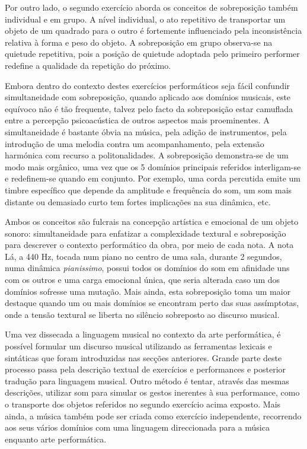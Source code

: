 \documentclass[../main.tex]{subfiles}
\begin{document}
Por outro lado, o segundo exercício aborda os conceitos de sobreposição também individual e em grupo. A nível individual, o ato repetitivo de transportar um objeto de um quadrado para o outro é fortemente influenciado pela inconsistência relativa à forma e peso do objeto. A sobreposição em grupo observa-se na quietude repetitiva, pois a posição de quietude adoptada pelo primeiro performer redefine a qualidade da repetição do próximo.

Embora dentro do contexto destes exercícios performáticos seja fácil confundir simultaneidade com sobreposição, quando aplicado aos domínios musicais, este equívoco não é tão frequente, talvez pelo facto da sobreposição estar camuflada entre a percepção psicoacústica de outros aspectos mais proeminentes. A simultaneidade é bastante óbvia na música, pela adição de instrumentos, pela introdução de uma melodia contra um acompanhamento, pela extensão harmónica com recurso a politonalidades. A sobreposição demonstra-se de um modo mais orgânico, uma vez que os 5 domínios principais referidos interligam-se e redefinem-se quando em conjunto. Por exemplo, uma corda percutida emite um timbre específico que depende da amplitude e frequência do som\cite{benade}, um som mais distante ou demasiado curto tem fortes implicações na sua dinâmica, etc.

Ambos os conceitos são fulcrais na concepção artística e emocional de um objeto sonoro: simultaneidade para enfatizar a complexidade textural e sobreposição para descrever o contexto performático da obra, por meio de cada nota. A nota Lá, a 440 Hz, tocada num piano no centro de uma sala, durante 2 segundos, numa dinâmica \textsl{pianissimo}, possui todos os domínios do som em afinidade uns com os outros e uma carga emocional única, que seria alterada caso um dos domínios sofresse uma mutação. Mais ainda, esta sobreposição toma um maior destaque quando um ou mais domínios se encontram perto das suas assímptotas, onde a tensão textural se liberta no silêncio sobreposto ao discurso musical.


Uma vez dissecada a linguagem musical no contexto da arte performática, é possível formular um discurso musical utilizando as ferramentas lexicais e sintáticas que foram introduzidas nas secções anteriores. Grande parte deste processo passa pela descrição textual de exercícios e performances e posterior tradução para linguagem musical. Outro método é tentar, através das mesmas descrições, utilizar som para simular os gestos inerentes à sua performance, como o transporte dos objetos referidos no segundo exercício acima exposto. Mais ainda, a música também pode ser criada como exercício independente, recorrendo aos seus vários domínios com uma linguagem direccionada para a música enquanto arte performática.
\end{document}
